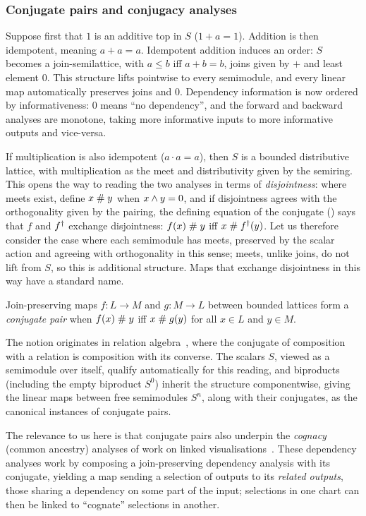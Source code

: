\subsubsection{Conjugate pairs and conjugacy analyses}

Suppose first that $1$ is an additive top in $S$ ($1 + a = 1$). Addition is then
idempotent, meaning $a + a = a$. Idempotent addition induces an order: $S$ becomes a join-semilattice,
with $a \leq b$ iff $a + b = b$, joins given by $+$ and least element $0$. This structure lifts pointwise to every semimodule,
and every linear map automatically preserves joins and $0$. Dependency
information is now ordered by informativeness: $0$ means ``no dependency'', and the forward and backward
analyses are monotone, taking more informative inputs to more informative outputs and vice-versa.

If multiplication is also idempotent ($a \cdot a = a$), then $S$ is a bounded distributive lattice,
with multiplication as the meet and distributivity given by the semiring. This opens the way to reading the
two analyses in terms of \emph{disjointness}: where meets exist, define $x \mathrel{\#} y$ when $x \wedge y = 0$, and
if disjointness agrees with the orthogonality given by the pairing, the defining equation of the conjugate
() says that $f$ and $f^{\dagger}$ exchange disjointness: $f(x) \mathrel{\#} y$ iff $x \mathrel{\#}
f^{\dagger}(y)$. Let us therefore consider the case where each semimodule has meets, preserved by the scalar action and
agreeing with orthogonality in this sense; meets, unlike joins, do not lift from $S$, so this is additional
structure. Maps that exchange disjointness in this way have a standard name.
\begin{definition}
  \label{def:conjugate-pair}
  Join-preserving maps $f : L \to M$ and $g : M \to L$ between bounded lattices form a \emph{conjugate
  pair} when $f(x) \mathrel{\#} y$ iff $x \mathrel{\#} g(y)$ for all $x \in L$ and $y \in M$.
\end{definition}
The notion originates in relation algebra~\cite{jonsson51}, where the conjugate of composition with a
relation is composition with its converse. The scalars $S$, viewed as a semimodule over itself, qualify
automatically for this reading, and biproducts (including the empty biproduct $S^0$) inherit the structure
componentwise, giving the linear maps between free semimodules $S^n$, along with their conjugates, as the canonical
instances of conjugate pairs.

The relevance to us here is that conjugate pairs also underpin the \emph{cognacy} (common ancestry)
analyses of work on linked visualisations~\cite{perera22,bond25}. These dependency analyses work by composing
a join-preserving dependency analysis with its conjugate, yielding a map sending a selection of outputs to its
\emph{related outputs}, those sharing a dependency on some part of the input; selections in one chart can then
be linked to ``cognate'' selections in another.

